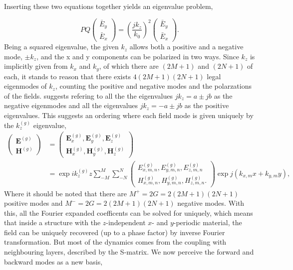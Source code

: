 Inserting these two equations together yields an eigenvalue problem,

\begin{equation}
\label{eq:fucking hell}
PQ\left(\begin{matrix}
    \bar E_y \\
    \bar E_x
\end{matrix}\right)  = \left(\frac{jk_z}{k_0}\right)^2 \left(\begin{matrix}
    \bar E_y \\
    \bar E_x
\end{matrix}\right).
\end{equation}
Being a squared eigenvalue, the given $k_z$ allows both a positive and a negative mode, $\pm k_z$, and the x and y components can be polarized in two ways.
Since $k_z$ is implicitly given from $k_x$ and $k_y$, of which there are $(2M+1)$ and $(2N+1)$ of each, it stands to reason that there exists
$4(2M+1)(2N+1)$ legal eigenmodes of $k_z$, counting the positive and negative modes and the polarzations of the fields. \cite{fmm} suggests refering to all the the eigenvalues $jk_z = a \pm jb$ as the negative eigenmodes and all the eigenvalues
$jk_z = -a \pm jb$ as the positive eigenvalues. This suggests an ordering where each field mode is given uniquely by the $k_z^{(g)}$ eigenvalue,
\begin{align}
\label{eq: newbasis who dis}
\left(\begin{matrix}
    \mathbf{E}^{(g)} \\
    \mathbf{H}^{(g)}
\end{matrix}\right) &= \left(\begin{matrix}
    \mathbf{E}^{(g)}_x, \mathbf{E}^{(g)}_y, \mathbf{E}^{(g)}_z \\
    \mathbf{H}^{(g)}_x, \mathbf{H}^{(g)}_y, \mathbf{H}^{(g)}_z
\end{matrix}\right) \\
 &= \exp{ik_z^{(g)}z}\sum_{-M}^{M}\sum_{-N}^{N}\left(\begin{matrix}
    E_{x,m,n}^{(g)}, E_{y,m,n}^{(g)}, E_{z,m,n}^{(g)} \\
    H_{x,m,n}^{(g)}, H_{y,m,n}^{(g)}, H_{z,m,n}^{(g)} .
\end{matrix}\right)\exp{j\left(k_{x,m}x+k_{y,m}y\right)},
\end{align}
Where it should be noted that there are $M^+=2G=2(2M+1)(2N+1)$ positive modes and $M^-=2G=2(2M+1)(2N+1)$ negative modes. With this, all the Fourier expanded coefficents can be solved for uniquely, which means that inside a structure with the $z$-independent $x$- and $y$-periodic material, the field
can be uniquely recovered (up to a phase factor) by inverse Fourier transformation. But most of the dynamics comes from the coupling with neighbouring layers, described by the S-matrix.
We now perceive the forward and backward modes as a new basis,

